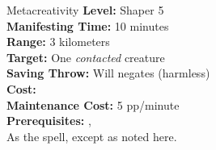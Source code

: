 {Metacreativity}
{
    \textbf{Level:}
    Shaper 5\\
    \textbf{Manifesting Time:}
    10 minutes\\
    \textbf{Range:}
    3 kilometers\\
    \textbf{Target:}
    One \emph{contacted} creature\\
    \textbf{Saving Throw:}
    Will negates (harmless)\\
    \textbf{Cost:}
    \\
    \textbf{Maintenance Cost:}
    5 pp/minute\\
    \textbf{Prerequisites:}
    , \\
}
{
    As the  spell, except as noted here.
}
